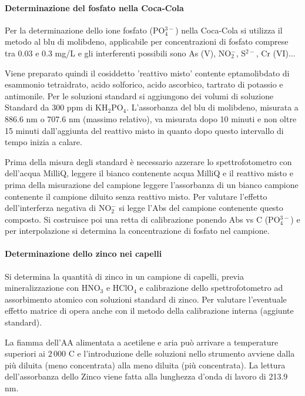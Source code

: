 \paragraph{Determinazione del fosfato nella Coca-Cola}
Per la determinazione dello ione fosfato (PO$_4^{3-}$) nella Coca-Cola si utilizza il metodo al blu di molibdeno, applicabile per concentrazioni di fosfato comprese tra 0.03 e 0.3 mg/L e gli interferenti possibili sono As (V), NO$_2^-$, S$^{2-}$, Cr (VI)...


Viene preparato quindi il cosiddetto 'reattivo misto' contente eptamolibdato di esammonio tetraidrato, acido solforico, acido ascorbico, tartrato di potassio e antimonile.
Per le soluzioni standard si aggiungono dei volumi di soluzione Standard da 300 ppm di KH$_2$PO$_4$.
L'assorbanza del blu di molibdeno, misurata a 886.6 nm o 707.6 nm (massimo relativo), va misurata dopo 10 minuti e non oltre 15 minuti dall'aggiunta del reattivo misto in quanto dopo questo intervallo di tempo inizia a calare.


Prima della misura degli standard è necessario azzerare lo spettrofotometro con dell'acqua MilliQ, leggere il bianco contenente acqua MilliQ e il reattivo misto e prima della misurazione del campione leggere l'assorbanza di un bianco campione contenente il campione diluito senza reattivo misto.
Per valutare l'effetto dell'interferza negativa di NO$_2^-$ si legge l'Abs del campione contenente questo composto.
Si costruisce poi una retta di calibrazione ponendo Abs vs C (PO$_4^{3-}$) e per interpolazione si determina la concentrazione di fosfato nel campione.

\paragraph{Determinazione dello zinco nei capelli}
Si determina la quantità di zinco in un campione di capelli, previa mineralizzazione con HNO$_3$ e HClO$_4$ e calibrazione dello spettrofotometro ad assorbimento atomico con soluzioni standard di zinco.
Per valutare l'eventuale effetto matrice di opera anche con il metodo della calibrazione interna (aggiunte standard).

La fiamma dell'AA alimentata a acetilene e aria può arrivare a temperature superiori ai $2\,000$ \degree C e l'introduzione delle soluzioni nello strumento avviene dalla più diluita (meno concentrata) alla meno diluita (più concentrata).
La lettura dell'assorbanza dello Zinco viene fatta alla lunghezza d'onda di lavoro di 213.9 nm.

